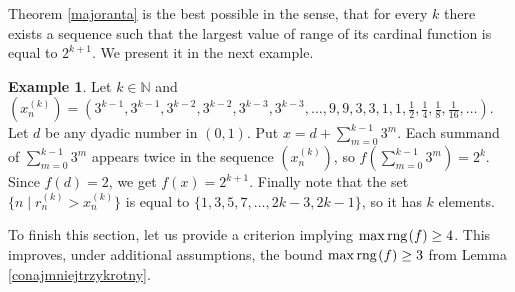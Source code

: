 \documentclass{amsart}
\theoremstyle{definition}
\newtheorem{example}[theorem]{Example}
\newcommand{\rng}{{\rm rng} \hspace{0.03cm}}
\begin{document}
Theorem \ref{majoranta} is the best possible in the sense, that for every $k$ there exists a sequence such that the largest value of range of its cardinal function is equal to $2^{k+1}$. We present it in the next example.

\begin{example}
Let $k\in\mathbb{N}$ and $(x_n^{(k)})=(3^{k-1},3^{k-1},3^{k-2},3^{k-2},3^{k-3},3^{k-3},\ldots,9,9,3,3,1,1,\frac{1}{2},\frac{1}{4},\frac{1}{8},\frac{1}{16},\ldots)$.
\\Let $d$ be any dyadic number in $(0,1)$. Put $x=d+\sum_{m=0}^{k-1} 3^m$. Each summand of $\sum_{m=0}^{k-1} 3^m$ appears twice in the sequence $(x_n^{(k)})$, so  $f(\sum_{m=0}^{k-1} 3^m)= 2^k$. Since $f(d)=2$, we get $f(x)=2^{k+1}$.
Finally note that the set $\{n \mid r_n^{(k)}>x_n^{(k)}\}$ is equal to $\{1,3,5,7,\ldots,2k-3,2k-1\}$, so it has $k$ elements.
\end{example}

To finish this section, let us provide a criterion implying $\max\rng (f)\geq 4$. This improves, under additional assumptions, the bound $\max\rng (f)\geq 3$ from Lemma \ref{conajmniejtrzykrotny}.
\end{document}
